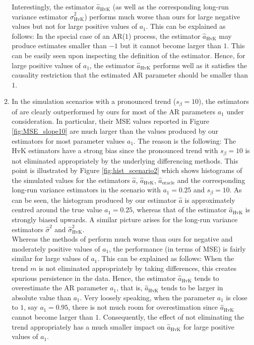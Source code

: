 \begin{enumerate}[label=(\alph*),leftmargin=0.7cm]
Interestingly, the estimator $\widehat{a}_{\text{HvK}}$ (as well as the corresponding long-run variance estimator $\widehat{\sigma}^2_{\text{HvK}}$) performs much worse than ours for large negative values but not for large positive values of $a_1$. This can be explained as follows: In the special case of an AR($1$) process, the estimator $\widehat{a}_{\text{HvK}}$ may produce estimates smaller than $-1$ but it cannot become larger than $1$. This can be easily seen upon inspecting the definition of the estimator. Hence, for large positive values of $a_1$, the estimator $\widehat{a}_{\text{HvK}}$ performs well as it satisfies the causality restriction that the estimated AR parameter should be smaller than $1$. 

\item In the simulation scenarios with a pronounced trend ($s_\beta = 10$), the estimators of \cite{Hall2003} are clearly outperformed by ours for most of the AR parameters $a_1$ under consideration. In particular, their MSE values reported in Figure \ref{fig:MSE_slope10} are much larger than the values produced by our estimators for most parameter values $a_1$. The reason is the following: The HvK estimators have a strong bias since the pronounced trend with $s_\beta = 10$ is not eliminated appropriately by the underlying differencing methods. This point is illustrated by Figure \ref{fig:hist_scenario2} which shows histograms of the simulated values for the estimators $\widehat{a}$, $\widehat{a}_{\text{HvK}}$, $\widehat{a}_{\text{oracle}}$ and the corresponding long-run variance estimators in the scenario with $a_1=0.25$ and $s_\beta = 10$. As can be seen, the histogram produced by our estimator $\widehat{a}$ is approximately centred around the true value $a_1 = 0.25$, whereas that of the estimator $\widehat{a}_{\text{HvK}}$ is strongly biased upwards. A similar picture arises for the long-run variance estimators $\widehat{\sigma}^2$ and $\widehat{\sigma}^2_{\text{HvK}}$. \\
Whereas the methods of \cite{Hall2003} perform much worse than ours for negative and moderately positive values of $a_1$, the performance (in terms of MSE) is fairly similar for large values of $a_1$. This can be explained as follows: When the trend $m$ is not eliminated appropriately by taking differences, this creates spurious persistence in the data. Hence, the estimator $\widehat{a}_{\text{HvK}}$ tends to overestimate the AR parameter $a_1$, that is, $\widehat{a}_{\text{HvK}}$ tends to be larger in absolute value than $a_1$. Very loosely speaking, when the parameter $a_1$ is close to $1$, say $a_1 = 0.95$, there is not much room for overestimation since $\widehat{a}_{\text{HvK}}$ cannot become larger than $1$. Consequently, the effect of not eliminating the trend appropriately has a much smaller impact on $\widehat{a}_{\text{HvK}}$ for large positive values of $a_1$. 


\end{enumerate}
